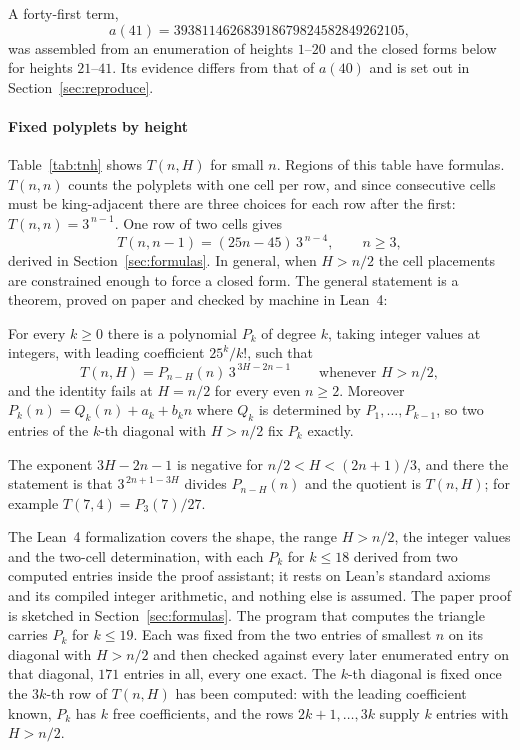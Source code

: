 \documentclass[11pt]{article}
\begin{document}
A forty-first term,
\[ a(41) = \num{393811462683918679824582849262105}, \]
was assembled from an enumeration of heights $1$--$20$ and the closed forms
below for heights $21$--$41$. Its evidence differs from that of $a(40)$ and is
set out in Section~\ref{sec:reproduce}.

\paragraph{Fixed polyplets by height} Table~\ref{tab:tnh} shows $T(n,H)$ for
small $n$. Regions of this table have formulas. $T(n,n)$ counts the polyplets
with one cell per row, and since consecutive cells must be king-adjacent
there are three choices for each row after the first: $T(n,n) = 3^{\,n-1}$.
One row of two cells gives
\[ T(n,n-1) = (25n - 45)\,3^{\,n-4}, \qquad n \ge 3, \]
derived in Section~\ref{sec:formulas}. In general, when $H > n/2$
the cell placements are constrained enough to force a closed form. The general
statement is a theorem, proved on paper and checked by machine in Lean~4:

\begin{theorem}
\label{thm:diag}
For every $k \ge 0$ there is a polynomial $P_k$ of degree $k$, taking integer
values at integers, with leading coefficient $25^k/k!$, such that
\[ T(n,H) = P_{n-H}(n)\,3^{\,3H-2n-1} \qquad \text{whenever } H > n/2, \]
and the identity fails at $H = n/2$ for every even $n \ge 2$. Moreover
$P_k(n) = Q_k(n) + a_k + b_k n$ where $Q_k$ is determined by $P_1, \dots,
P_{k-1}$, so two entries of the $k$-th diagonal with $H > n/2$ fix $P_k$
exactly.
\end{theorem}

The exponent $3H - 2n - 1$ is negative for $n/2 < H < (2n+1)/3$, and there
the statement is that $3^{\,2n+1-3H}$ divides $P_{n-H}(n)$ and the quotient is
$T(n,H)$; for example $T(7,4) = P_3(7)/27$.

The Lean~4 formalization covers the shape, the range $H > n/2$, the
integer values and the two-cell determination, with each $P_k$ for $k \le 18$
derived from two computed entries inside the proof assistant; it rests on
Lean's standard axioms and its compiled integer arithmetic, and nothing else
is assumed. The paper proof is sketched in
Section~\ref{sec:formulas}. The program that computes the triangle carries
$P_k$ for $k \le 19$. Each was fixed from the
two entries of smallest $n$ on its diagonal with $H > n/2$ and then checked
against every later enumerated entry on that diagonal, $171$ entries in all,
every one exact. The $k$-th diagonal is fixed once the $3k$-th row of $T(n,H)$ has been
computed: with the leading coefficient known, $P_k$ has $k$ free coefficients,
and the rows $2k+1, \dots, 3k$ supply $k$ entries with $H > n/2$.
\end{document}
